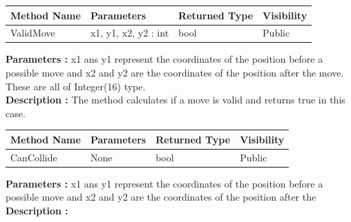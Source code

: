 \documentclass[12pt, letterpaper, twoside]{article}
\begin{document}
\begin{table}[H]
    \begin{tabular}{|l|l|l|l|}
    \hline
    \rowcolor[HTML]{EFEFEF} 
    \cellcolor[HTML]{EFEFEF}\textbf{Method Name} & \textbf{Parameters}  & \textbf{Returned Type} & \textbf{Visibility} \\ \hline
    ValidMove                          & x1, y1, x2, y2 : int & bool                   & Public              \\ \hline
    \end{tabular}
\end{table}

\textbf{Parameters :} x1 ans y1 represent the coordinates of the position before a possible move
and x2 and y2 are the coordinates of the position after the move. These are all of Integer(16) type.
\\
\textbf{Description :} The method calculates if a move is valid and returns true in this case.

\begin{table}[H]
    \begin{tabular}{|l|l|l|l|}
    \hline
    \rowcolor[HTML]{EFEFEF} 
    \cellcolor[HTML]{EFEFEF}\textbf{Method Name} & \textbf{Parameters}  & \textbf{Returned Type} & \textbf{Visibility} \\ \hline
    CanCollide                                   & None                 & bool                   & Public              \\ \hline
    \end{tabular}
\end{table}

\textbf{Parameters :} x1 ans y1 represent the coordinates of the position before a possible move
and x2 and y2 are the coordinates of the position after the 
\textbf{Description :} 

\newpage
\end{document}
